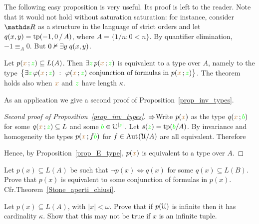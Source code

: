 \documentclass[creche.tex]{subfiles}
\begin{document}
The following easy proposition is very useful. Its proof is left to the reader. Note that it would not hold without saturation saturation: for instance, consider $\RR$ as a structure in the language of strict orders and let $q(x,y)={\rm tp}(-1, 0\,/\,A)$, where $A=\{1/n: 0<n\}$. By quantifier elimination, $-1\equiv_{A}0$. But $0\nvDash\exists y\;q(x,y)$.


\begin{proposition}\label{prop_E_type}
Let $p({\color{brown} x}\,;{\color{green} z})\subseteq L(A)$. Then $\exists {\color{green}z}\,p({\color{brown} x}\,;{\color{green} z})$ is equivalent to a type over $A$, namely to the type $\big\{ \exists {\color{green}z}\,\varphi({\color{brown} x}\,;{\color{green} z})\ :\ \varphi({\color{brown} x}\,;{\color{green} z}) \textrm{ conjunction of formulas in }  p({\color{brown} x}\,;{\color{green} z})\big\}$. The theorem holds also when ${\color{brown} x}$ and ${\color{green} z}$ have length $\kappa$.\QED 
\end{proposition}


As an application we give a second proof of Proposition~\ref{prop_inv_types}.

\begin{proof}[Second proof of Proposition~\ref{prop_inv_types}] $\Rightarrow$\quad  Write $p({\color{brown} x})$ as the type $q({\color{brown} x}\,;{\color{green} b})$ for some $q({\color{brown} x}\,;{\color{green} z})\subseteq L$ and some ${\color{green} b}\in\EuScript U^{|{\color{green} z}|}$. Let $s({\color{green} z})={\rm tp}({\color{green} b}/A)$. By invariance and homogeneity the types $p({\color{brown} x}\,;f{\color{green} b})$ for $f\in\textrm{Aut\kern.15ex}(\EuScript U/A)$ are all equivalent. Therefore

\smallskip

\smallskip

\smallskip

Hence, by Proposition~\ref{prop_E_type}, $p({\color{brown} x})$ is equivalent to a type over $A$.
\end{proof}


\begin{exercise}\label{ex_clopen_definibili}
Let $p(x)\subseteq L(A)$ be such that $\neg p(x)\iff q(x)$ for some $q(x)\subseteq L(B)$. Prove that $p(x)$ is equivalent to some conjunction of formulas in $p(x)$. Cfr.\@ Theorem~\ref{Stone_aperti_chiusi}.\QED 
\end{exercise}


\begin{exercise}\label{cadinalitafinitasaturazione}
Let $p(x)\subseteq L(A)$, with $|x|<\omega$. Prove that if $p(\EuScript U)$ is infinite then it has cardinality $\kappa$. Show that this may not be true if $x$ is an infinite tuple.\QED 
\end{exercise}
\end{document}
